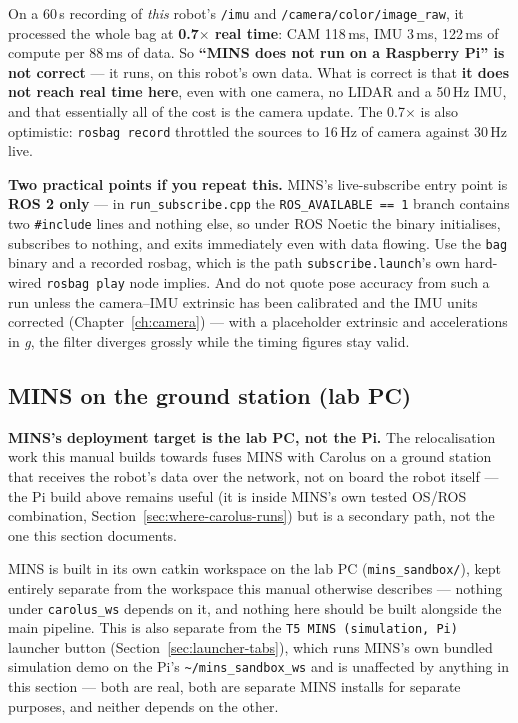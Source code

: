 \documentclass[11pt]{report}
\begin{document}
On a 60\,s recording of \emph{this} robot's \texttt{/imu} and
\texttt{/camera/color/image\_raw}, it processed the whole bag at
\textbf{0.7$\times$ real time}: CAM 118\,ms, IMU 3\,ms, 122\,ms of compute
per 88\,ms of data. So \textbf{``MINS does not run on a Raspberry Pi'' is not
correct} --- it runs, on this robot's own data. What is correct is that
\textbf{it does not reach real time here}, even with one camera, no LIDAR and
a 50\,Hz IMU, and that essentially all of the cost is the camera update. The
0.7$\times$ is also optimistic: \texttt{rosbag record} throttled the sources
to 16\,Hz of camera against 30\,Hz live.

\textbf{Two practical points if you repeat this.} MINS's live-subscribe entry
point is \textbf{ROS 2 only} --- in \texttt{run\_subscribe.cpp} the
\texttt{ROS\_AVAILABLE == 1} branch contains two \texttt{\#include} lines and
nothing else, so under ROS Noetic the binary initialises, subscribes to
nothing, and exits immediately even with data flowing. Use the \texttt{bag}
binary and a recorded rosbag, which is the path \texttt{subscribe.launch}'s
own hard-wired \texttt{rosbag play} node implies. And do not quote pose
accuracy from such a run unless the camera--IMU extrinsic has been
calibrated and the IMU units corrected (Chapter~\ref{ch:camera}) --- with a
placeholder extrinsic and accelerations in \emph{g}, the filter diverges
grossly while the timing figures stay valid.

\subsection{MINS on the ground station (lab PC)}
\label{sec:mins-ground-station}

\textbf{MINS's deployment target is the lab PC, not the Pi.} The relocalisation
work this manual builds towards fuses MINS with Carolus on a ground station
that receives the robot's data over the network, not on board the robot
itself --- the Pi build above remains useful (it is inside MINS's own tested
OS/ROS combination, Section~\ref{sec:where-carolus-runs}) but is a secondary
path, not the one this section documents.

MINS is built in its own catkin workspace on the lab PC
(\texttt{mins\_sandbox/}), kept entirely separate from the workspace this
manual otherwise describes --- nothing under \texttt{carolus\_ws} depends on
it, and nothing here should be built alongside the main pipeline. This is
also separate from the \texttt{T5 MINS (simulation, Pi)} launcher button
(Section~\ref{sec:launcher-tabs}), which runs MINS's own bundled simulation
demo on the Pi's \texttt{\textasciitilde{}/mins\_sandbox\_ws} and is
unaffected by anything in this section --- both are real, both are
separate MINS installs for separate purposes, and neither depends on the
other.
\end{document}
